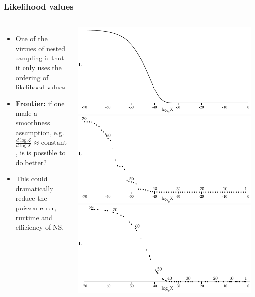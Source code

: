 \documentclass[aspectratio=169]{beamer}
\begin{document}
\begin{frame}
    \frametitle{Likelihood values}
    \begin{columns}
    \begin{itemize}
        \item One of the virtues of nested sampling is that it only uses the ordering of likelihood values.
        \item \textbf{Frontier:} if one made a smoothness assumption, e.g. $\frac{d\log \mathcal{L}}{d\log X}\approx \mathrm{constant}$, is is possible to do better?
        \item This could dramatically reduce the poisson error, runtime and efficiency of NS.
    \end{itemize}
    \includegraphics[width=\textwidth]{figures/values1}
    \includegraphics[width=\textwidth]{figures/values}
    \includegraphics[width=\textwidth]{figures/values2}
    \end{columns}
\end{frame}
\end{document}
